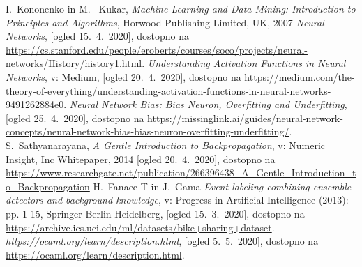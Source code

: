 \documentclass[mat1]{fmfdelo}
\begin{document}
\begin{thebibliography}{99}
%
I.~Kononenko in M.~ Kukar, \emph{Machine Learning and Data Mining: Introduction to Principles and Algorithms}, Horwood Publishing Limited, UK, 2007
%
\emph{Neural Networks}, [ogled 15.~4.~2020], dostopno na \url{https://cs.stanford.edu/people/eroberts/courses/soco/projects/neural-networks/History/history1.html}.
%
\emph{Understanding Activation Functions in Neural Networks}, v: Medium, [ogled 20.~4.~2020], dostopno na \url{https://medium.com/the-theory-of-everything/understanding-activation-functions-in-neural-networks-9491262884e0}.
%
\emph{Neural Network Bias: Bias Neuron, Overfitting and Underfitting}, [ogled 25.~4.~2020], dostopno na \url{https://missinglink.ai/guides/neural-network-concepts/neural-network-bias-bias-neuron-overfitting-underfitting/}.
%
S.~Sathyanarayana, \emph{A Gentle Introduction to Backpropagation}, v: Numeric Insight, Inc Whitepaper, 2014 [ogled 20.~4.~2020], dostopno na \url{https://www.researchgate.net/publication/266396438_A_Gentle_Introduction_to_Backpropagation}
%
H.~Fanaee-T in J.~Gama \emph{Event labeling combining ensemble detectors and background knowledge}, v:  Progress in Artificial Intelligence (2013): pp. 1-15, Springer Berlin Heidelberg, [ogled 15.~3.~2020], dostopno na \url{https://archive.ics.uci.edu/ml/datasets/bike+sharing+dataset}.
%
 \emph{https://ocaml.org/learn/description.html}, [ogled 5.~5.~2020], dostopno na \url{https://ocaml.org/learn/description.html}.
\end{thebibliography}
\end{document}
